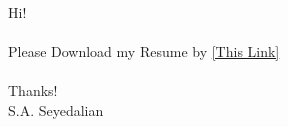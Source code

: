 \documentclass[letter]{res}
\begin{document}
	Hi! \\\\
			Please Download my Resume by \href{https://github.com/sedaliSedalian/resume_latex_template/raw/master/resume.pdf}{[This Link]}\\\\
	Thanks!\\
	S.A. Seyedalian
\end{document}
